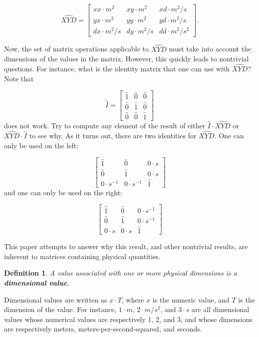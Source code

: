 \documentclass[10pt,letterpaper]{article}
\newtheorem{defn}{Definition}[section]
\numberwithin{equation}{section}
\begin{document}
\[ \widehat{XYD}= \left[ \begin{matrix}
  xx \cdot m^2 & xy \cdot m^2 & xd \cdot m^2/s \\
  yx \cdot m^2 & yy \cdot m^2 & yd \cdot m^2/s \\
  dx \cdot m^2/s & dy \cdot m^2/s & dd \cdot m^2/s^2
\end{matrix} \right]. \]

Now, the set of matrix operations applicable to $\widehat{XYD}$ must take into
account the dimensions of the values in the matrix.  However, this quickly
leads to nontrivial questions.  For instance, what is the identity matrix that
one can use with $\widehat{XYD}$?  Note that

\[ \hat I = \left[ \begin{matrix} 
  \hat 1 & \hat 0 & \hat 0 \\
  \hat 0 & \hat 1 & \hat 0 \\
  \hat 0 & \hat 0 & \hat 1
 \end{matrix} \right] \] does not work.  Try to compute any element of
the result of either $\hat I \cdot \widehat{XYD}$ or $\widehat{XYD}
\cdot \hat I$ to see why.  As it turns out, there are two identities
for $\widehat{XYD}$.  One can only be used on the left:
 
 \[ \left[ \begin{matrix} 
  \hat 1 & \hat 0 & 0 \cdot s \\
  \hat 0 & \hat 1 & 0 \cdot s \\
  0 \cdot s^{-1} & 0 \cdot s^{-1} & \hat 1
 \end{matrix} \right] \] and one can only be used on the right:

\[ \left[ \begin{matrix} 
  \hat 1 & \hat 0 & 0 \cdot s^{-1} \\
  \hat 0 & \hat 1 & 0 \cdot s^{-1} \\
  0 \cdot s & 0 \cdot s & \hat 1
 \end{matrix} \right] \]
 
This paper attempts to answer why this result, and other nontrivial
results, are inherent to matrices containing physical quantities.

\begin{defn} A value associated with one or more physical dimensions
  is a \textbf{dimensional value}. \end{defn}
 
Dimensional values are written as $x \cdot T$, where $x$ is the
numeric value, and $T$ is the dimension of the value.  For instance,
$1 \cdot m$, $2 \cdot m/s^2$, and $3 \cdot s$ are all dimensional
values whose numerical values are respectively 1, 2, and 3, and whose
dimensions are respectively meters, meters-per-second-squared, and
seconds.
 
\end{document}
